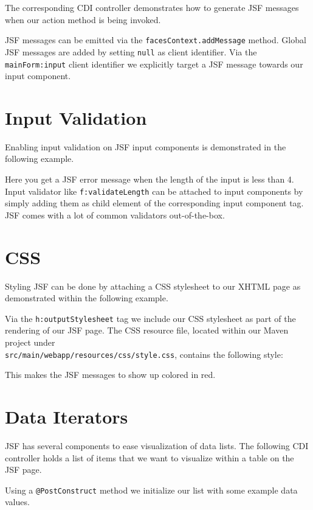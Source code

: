 The corresponding CDI controller demonstrates how to generate JSF messages when our action method is being invoked.

JSF messages can be emitted via the \texttt{facesContext.addMessage} method.
Global JSF messages are added by setting \texttt{null} as client identifier.
Via the \texttt{mainForm:input} client identifier we explicitly target a JSF message towards our input component.

\section{Input Validation}

Enabling input validation on JSF input components is demonstrated in the following example.

Here you get a JSF error message when the length of the input is less than 4.
Input validator like \texttt{f:validateLength} can be attached to input components by simply adding them as child element of the corresponding input component tag.
JSF comes with a lot of common validators out-of-the-box.

\section{CSS}

Styling JSF can be done by attaching a CSS stylesheet to our XHTML page as demonstrated within the following example.

Via the \texttt{h:outputStylesheet} tag we include our CSS stylesheet as part of the rendering of our JSF page.
The CSS resource file, located within our Maven project under\\
\texttt{src/main/webapp/resources/css/style.css}, contains the following style:

This makes the JSF messages to show up colored in red.

\section{Data Iterators}

JSF has several components to ease visualization of data lists.
The following CDI controller holds a list of items that we want to visualize within a table on the JSF page.

Using a \texttt{@PostConstruct} method we initialize our list with some example data values.

